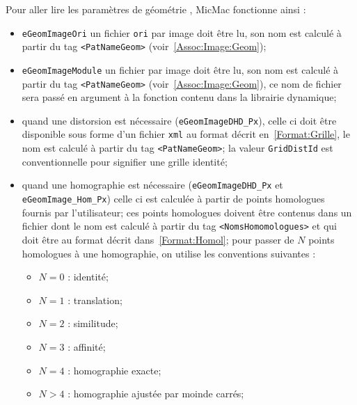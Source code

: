 \label{Lec:Param:Geom}

Pour aller lire les param\`etres de g\'eom\'etrie ,
MicMac fonctionne ainsi :

\begin{itemize}
   \item  {\tt eGeomImageOri} un fichier {\tt ori} par image doit \^etre
          lu,   son nom est calcul\'e \`a partir du tag {\tt <PatNameGeom>}
          (voir~\ref{Assoc:Image:Geom});

   \item  {\tt eGeomImageModule} un fichier par image doit \^etre lu,
          son nom est calcul\'e \`a partir du tag {\tt <PatNameGeom>}
          (voir~\ref{Assoc:Image:Geom}), ce nom de fichier sera pass\'e 
          en argument \`a la fonction contenu dans la librairie   dynamique;

   \item quand une distorsion est n\'ecessaire ({\tt eGeomImageDHD\_Px}),
         celle ci doit \^etre disponible sous forme d'un fichier
         {\tt xml} au format d\'ecrit en~\ref{Format:Grille},  le nom est 
         calcul\'e \`a partir du tag {\tt <PatNameGeom>}; la valeur 
         {\tt GridDistId} est conventionnelle pour signifier une grille
         identit\'e;

   \item quand une homographie est n\'ecessaire 
         ({\tt eGeomImageDHD\_Px} et {\tt eGeomImage\_Hom\_Px}) 
         celle ci est calcul\'ee \`a partir de  points
         homologues fournis par l'utilisateur;
         ces points homologues doivent \^etre contenus dans un fichier
         dont le nom est calcul\'e \`a partir du tag {\tt <NomsHomomologues>}
         et qui doit \^etre au format d\'ecrit dans~\ref{Format:Homol};
         pour passer de $N$ points homologues \`a  une homographie, on
         utilise les conventions suivantes :

       \begin{itemize}
            \item $N=0$ : identit\'e;
            \item $N=1$ : translation;
            \item $N=2$ : similitude;
            \item $N=3$ : affinit\'e;
            \item $N=4$ : homographie exacte;
            \item $N>4$ : homographie ajust\'ee par moinde carr\'es;
       \end{itemize}
         
\end{itemize}


